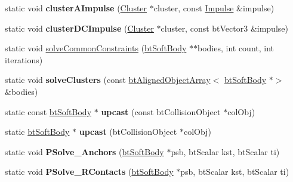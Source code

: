\begin{DoxyCompactItemize}
\mbox{\label{classbtSoftBody_affddc2d7f3b500c44d9e1f703df0cc33}} 
static void {\bfseries cluster\+A\+Impulse} (\hyperlink{structbtSoftBody_1_1Cluster}{Cluster} $\ast$cluster, const \hyperlink{structbtSoftBody_1_1Impulse}{Impulse} \&impulse)
\item 
\mbox{\label{classbtSoftBody_a7a988e2954fdf0f8f4691599ca645d9b}} 
static void {\bfseries cluster\+D\+C\+Impulse} (\hyperlink{structbtSoftBody_1_1Cluster}{Cluster} $\ast$cluster, const bt\+Vector3 \&impulse)
\item 
static void \hyperlink{classbtSoftBody_ae8a2fc459b2afc985fbb03c1b0203bec}{solve\+Common\+Constraints} (\hyperlink{classbtSoftBody}{bt\+Soft\+Body} $\ast$$\ast$bodies, int count, int iterations)
\item 
\mbox{\label{classbtSoftBody_a0059efa007e4b3600b763edfa22d8bd6}} 
static void {\bfseries solve\+Clusters} (const \hyperlink{classbtAlignedObjectArray}{bt\+Aligned\+Object\+Array}$<$ \hyperlink{classbtSoftBody}{bt\+Soft\+Body} $\ast$$>$ \&bodies)
\item 
\mbox{\label{classbtSoftBody_ac6209b1843fd2511b477547c648adb67}} 
static const \hyperlink{classbtSoftBody}{bt\+Soft\+Body} $\ast$ {\bfseries upcast} (const bt\+Collision\+Object $\ast$col\+Obj)
\item 
\mbox{\label{classbtSoftBody_ab401977a2814ec48a984a2c0e5864939}} 
static \hyperlink{classbtSoftBody}{bt\+Soft\+Body} $\ast$ {\bfseries upcast} (bt\+Collision\+Object $\ast$col\+Obj)
\item 
\mbox{\label{classbtSoftBody_a4958237e624f63ec359a10231a11a19a}} 
static void {\bfseries P\+Solve\+\_\+\+Anchors} (\hyperlink{classbtSoftBody}{bt\+Soft\+Body} $\ast$psb, bt\+Scalar kst, bt\+Scalar ti)
\item 
\mbox{\label{classbtSoftBody_aaafba18f5de9bc2d62a41b15fc0421bb}} 
static void {\bfseries P\+Solve\+\_\+\+R\+Contacts} (\hyperlink{classbtSoftBody}{bt\+Soft\+Body} $\ast$psb, bt\+Scalar kst, bt\+Scalar ti)
\item 
\mbox{\label{classbtSoftBody_a03cec6f0910a538cbc1a54bb4aaeea42}} 

\end{DoxyCompactItemize}
